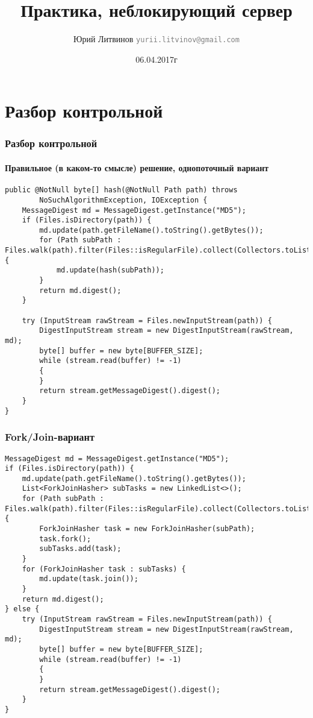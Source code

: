\documentclass[xetex,mathserif,serif]{beamer}
\title{Практика, неблокирующий сервер}
\author[Юрий Литвинов]{Юрий Литвинов \newline \textcolor{gray}{\small\texttt{yurii.litvinov@gmail.com}}}
\date{06.04.2017г}
\begin{document}
	
	\frame{\titlepage}
	
	\section{Разбор контрольной}

	\begin{frame}[fragile]
		\frametitle{Разбор контрольной}
		\framesubtitle{Правильное (в каком-то смысле) решение, однопоточный вариант}
		\begin{scriptsize}
			\begin{verbatim}
public @NotNull byte[] hash(@NotNull Path path) throws 
        NoSuchAlgorithmException, IOException {
    MessageDigest md = MessageDigest.getInstance("MD5");
    if (Files.isDirectory(path)) {
        md.update(path.getFileName().toString().getBytes());
        for (Path subPath : Files.walk(path).filter(Files::isRegularFile).collect(Collectors.toList())) {
            md.update(hash(subPath));
        }
        return md.digest();
    }

    try (InputStream rawStream = Files.newInputStream(path)) {
        DigestInputStream stream = new DigestInputStream(rawStream, md);
        byte[] buffer = new byte[BUFFER_SIZE];
        while (stream.read(buffer) != -1)
        {
        }
        return stream.getMessageDigest().digest();
    }
}
			\end{verbatim}
		\end{scriptsize}
\end{frame}

	\begin{frame}[fragile]
		\frametitle{Fork/Join-вариант}
		\begin{scriptsize}
			\begin{verbatim}
MessageDigest md = MessageDigest.getInstance("MD5");
if (Files.isDirectory(path)) {
    md.update(path.getFileName().toString().getBytes());
    List<ForkJoinHasher> subTasks = new LinkedList<>();
    for (Path subPath : Files.walk(path).filter(Files::isRegularFile).collect(Collectors.toList())) {
        ForkJoinHasher task = new ForkJoinHasher(subPath);
        task.fork();
        subTasks.add(task);
    }
    for (ForkJoinHasher task : subTasks) {
        md.update(task.join());
    }
    return md.digest();
} else {
    try (InputStream rawStream = Files.newInputStream(path)) {
        DigestInputStream stream = new DigestInputStream(rawStream, md);
        byte[] buffer = new byte[BUFFER_SIZE];
        while (stream.read(buffer) != -1)
        {
        }
        return stream.getMessageDigest().digest();
    }
}
			\end{verbatim}
		\end{scriptsize}
\end{frame}
\end{document}
